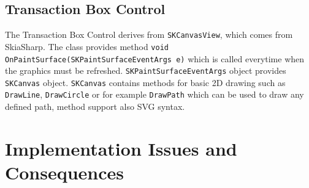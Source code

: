 \subsection{Transaction Box Control}
The Transaction Box Control derives from \texttt{SKCanvasView}, which comes from SkiaSharp. The class provides method \texttt{void OnPaintSurface(SKPaintSurfaceEventArgs e)} which is called everytime when the graphics must be refreshed. \texttt{SKPaintSurfaceEventArgs} object provides \texttt{SKCanvas} object. \texttt{SKCanvas} contains methods for basic 2D drawing such as \texttt{DrawLine}, \texttt{DrawCircle} or for example \texttt{DrawPath} which can be used to draw any defined path, method support also SVG syntax. 
\section{Implementation Issues and Consequences}
